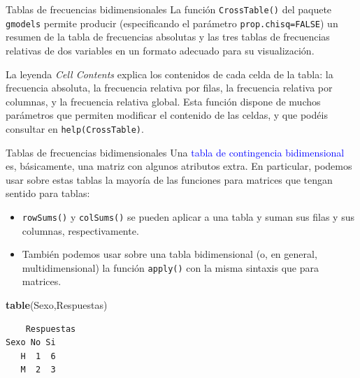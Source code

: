 \documentclass[
  ignorenonframetext,
]{beamer}
\newenvironment{Shaded}{\begin{snugshade}}{\end{snugshade}}
\newcommand{\FunctionTok}[1]{\textcolor[rgb]{0.13,0.29,0.53}{\textbf{#1}}}
\newcommand{\NormalTok}[1]{#1}
\newcommand\blue[1]{\textcolor{blue}{#1}}
\begin{document}
\begin{frame}[fragile]{Tablas de frecuencias bidimensionales}
\label{tablas-de-frecuencias-bidimensionales-7}
La función \texttt{CrossTable()} del paquete \texttt{gmodels} permite
producir (especificando el parámetro \texttt{prop.chisq=FALSE}) un
resumen de la tabla de frecuencias absolutas y las tres tablas de
frecuencias relativas de dos variables en un formato adecuado para su
visualización.

La leyenda \emph{Cell Contents} explica los contenidos de cada celda de
la tabla: la frecuencia absoluta, la frecuencia relativa por filas, la
frecuencia relativa por columnas, y la frecuencia relativa global. Esta
función dispone de muchos parámetros que permiten modificar el contenido
de las celdas, y que podéis consultar en \texttt{help(CrossTable)}.
\end{frame}

\begin{frame}[fragile]{Tablas de frecuencias bidimensionales}
\label{tablas-de-frecuencias-bidimensionales-8}
Una \blue{tabla de contingencia bidimensional} es, básicamente, una
matriz con algunos atributos extra. En particular, podemos usar sobre
estas tablas la mayoría de las funciones para matrices que tengan
sentido para tablas:

\begin{itemize}
\item
  \texttt{rowSums()} y \texttt{colSums()} se pueden aplicar a una tabla
  y suman sus filas y sus columnas, respectivamente.
\item
  También podemos usar sobre una tabla bidimensional (o, en general,
  multidimensional) la función \texttt{apply()} con la misma sintaxis
  que para matrices.
\end{itemize}

\begin{Shaded}
\begin{Highlighting}[]
\FunctionTok{table}\NormalTok{(Sexo,Respuestas) }
\end{Highlighting}
\end{Shaded}

\begin{verbatim}
    Respuestas
Sexo No Si
   H  1  6
   M  2  3
\end{verbatim}
\end{frame}
\end{document}
